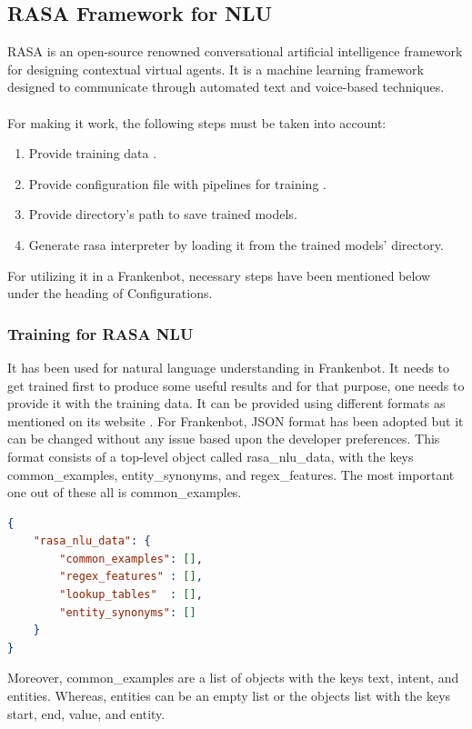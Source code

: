 \subsection{RASA Framework for NLU \label{subsec:rasanlu}}
RASA is an open-source renowned conversational artificial intelligence framework for designing contextual virtual agents. It is a machine learning framework designed to communicate through automated text and voice-based techniques. \cite{rasa}
\\~\\
For making it work, the following steps must be taken into account:
\begin{enumerate}
    \item Provide training data \cite{rasatrainingdata}.
    \item Provide configuration file with pipelines for training \cite{rasapipeline}.
    \item Provide directory's path to save trained models.
    \item Generate rasa interpreter by loading it from the trained models' directory.
\end{enumerate}
For utilizing it in a Frankenbot, necessary steps have been mentioned below under the heading of Configurations.
 
\subsubsection*{Training for RASA NLU}
It has been used for natural language understanding in Frankenbot. It needs to get trained first to produce some useful results and for that purpose, one needs to provide it with the training data. It can be provided using different formats as mentioned on its website \cite{rasatrainingdata}. For Frankenbot, JSON format has been adopted but it can be changed without any issue based upon the developer preferences. This format consists of a top-level object called rasa\_nlu\_data, with the keys common\_examples, entity\_synonyms, and regex\_features. The most important one out of these all is common\_examples.

\begin{lstlisting}[language=json,firstnumber=1]
{
    "rasa_nlu_data": {
        "common_examples": [],
        "regex_features" : [],
        "lookup_tables"  : [],
        "entity_synonyms": []
    }
}
\end{lstlisting}
 Moreover, common\_examples are a list of objects with the keys text, intent, and entities. Whereas, entities can be an empty list or the objects list with the keys start, end, value, and entity.
 
